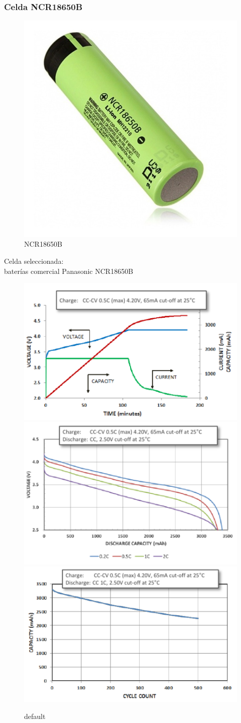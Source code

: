 \documentclass[10pt]{beamer}
\theoremstyle{remark}
\theoremstyle{definition}
\begin{document}
\begin{frame}
\frametitle{Celda NCR18650B }

\begin{figure}
\vspace{-5pt}
\begin{center}
	\includegraphics[width=0.6\linewidth]{images/18650}
	\caption{NCR18650B}
	\end{center}
	
\end{figure}
Celda seleccionada:\\ baterías comercial Panasonic NCR18650B

\vspace{60pt}

\begin{figure}[!b]

\centering
\includegraphics[width=.32\textwidth]{images/cc_cv_18650}\hfill
\includegraphics[width=.32\textwidth]{images/discharge_18650}\hfill
\includegraphics[width=.32\textwidth]{images/life_cycle_18650}

\caption{default}
\label{fig:figure3}

\end{figure}

\end{frame}
\end{document}
